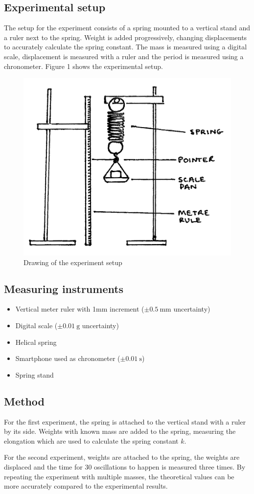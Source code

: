\documentclass[a4paper, 10pt]{article}
\newcommand{\unit}[1]{~\mathrm{#1}}
\begin{document}
\begin{justify}
\subsection{Experimental setup}
The setup for the experiment consists of a spring mounted to a vertical stand
and a ruler next to the spring. Weight is added progressively, changing
displacements to accurately calculate the spring constant. The mass is measured
using a digital scale, displacement is measured with a ruler and the period is
measured using a chronometer. Figure 1 shows the experimental setup.
\begin{figure}[!h]
    \centering
    \includegraphics[width = 0.5\linewidth]{13.png}
    \caption{Drawing of the experiment setup\cite{noauthor_b5-2_nodate}}
\end{figure}
\newpage
\subsection{Measuring instruments}
\begin{itemize}
    \item Vertical meter ruler with 1mm increment ($\pm 0.5\unit{mm}$ uncertainty)
    \item Digital scale ($\pm 0.01\unit{g}$ uncertainty)
    \item Helical spring
    \item Smartphone used as chronometer ($\pm  0.01\unit{s} $)
    \item Spring stand
\end{itemize}
\subsection{Method}
\justifying
For the first experiment, the spring is attached to the vertical stand with a ruler by its side. Weights
with known mass are added to the spring, measuring the elongation which are used
to calculate the spring constant $k$.
\par
For the second experiment, weights are attached to the spring, the weights
are displaced and the time for 30 oscillations to happen is measured three
times. By repeating the experiment with multiple masses, the theoretical values
can be more accurately compared to the experimental results.

\end{justify}
\end{document}
